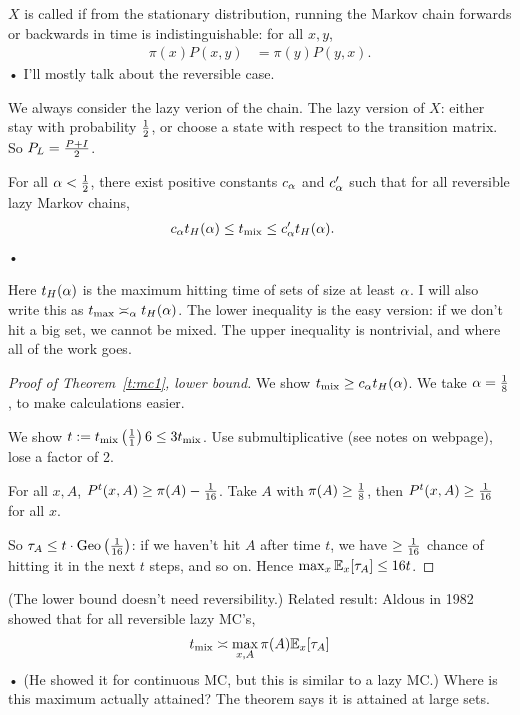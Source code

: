 $X$ is called  if from the stationary distribution, running the Markov chain forwards or backwards in time is indistinguishable: for all $x,y$,
\begin{align*}
\pi(x)P(x,y) &= \pi(y)P(y,x).
\end{align*}•
I'll mostly talk about the reversible case.

We always consider the lazy verion of the chain. The lazy version of $X$: either stay with probability $\frac{1}{2}$, or choose a state with respect to the transition matrix. So $P_L = \frac{P+I}{2}$.

\begin{thm}\label{t:mc1}
For all $\alpha<\frac{1}{2}$, there exist positive constants $c_\alpha$ and $c_\alpha'$ such that for all reversible  lazy Markov chains,
\begin{align*}
c_\alpha t_H(\alpha)&\le t_{\text{mix}} \le c_\alpha' t_H(\alpha).
\end{align*}•
\end{thm}
Here $t_H(\alpha)$ is the maximum hitting time of sets of size at least $\alpha$.
I will also write this as $t_{\max}\asymp_\alpha t_H(\alpha)$. 
The lower inequality is the easy version: if we don't hit a big set, we cannot be mixed. The upper inequality is nontrivial, and where all of the work goes.

\begin{proof}[Proof of Theorem~\ref{t:mc1}, lower bound]
We show $t_{\text{mix}}\ge c_\alpha t_H(\alpha)$. We take $\alpha=\frac{1}{8}$, to make calculations easier.

We show $t:=t_{\text{mix}}\left( {\frac{1}{1}} \right)6\le 3t_{\text{mix}}$. Use submultiplicative (see notes on webpage), lose a factor of 2.

For all $x, A$, $P^t(x,A)\ge \pi(A)-\frac{1}{16}$. Take $A$ with $\pi(A)\ge \frac{1}{8}$, then $P^t(x,A)\ge \frac{1}{16}$ for all $x$. 

So $\tau_A \le t\cdot \text{Geo}\left( {\frac{1}{16}} \right)$: if we haven't hit $A$ after time $t$, we have $\ge \frac{1}{16}$ chance of hitting it in the next $t$ steps, and so on. 
Hence $\max_x \mathbb{E}_x[\tau_A]\le 16t$. 
\end{proof}
(The lower bound doesn't need reversibility.)
Related result: Aldous in 1982 showed that for all reversible lazy MC's,
\begin{align*}
t_{\text{mix}} \asymp \max_{x,A}\pi(A) \mathbb{E}_x[\tau_A]
\end{align*}•
(He showed it for continuous MC, but this is similar to a lazy MC.)
Where is this maximum actually attained? The theorem says it is attained at large sets.

